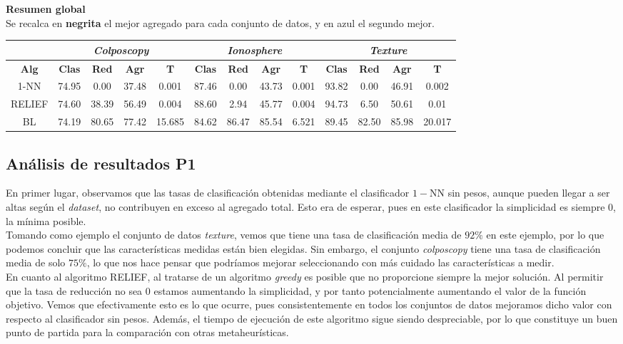 \documentclass[12pt]{article}
\begin{document}
\textbf{Resumen global}\\

Se recalca en \textbf{negrita} el mejor agregado para cada conjunto de datos, y en {\color{blue} azul} el segundo mejor.

\begin{table}[h]
\begin{tabular}{ccccc|cccc|cccc}
\centering
 & \multicolumn{4}{c}{\textit{Colposcopy}} & \multicolumn{4}{c}{\textit{Ionosphere}} & \multicolumn{4}{c}{\textit{Texture}} \\ \hline
\textbf{Alg} & \textbf{Clas} & \textbf{Red} & \textbf{Agr} & \textbf{T} & \textbf{Clas} & \textbf{Red} & \textbf{Agr} & \textbf{T} & \textbf{Clas} & \textbf{Red} & \textbf{Agr} & \textbf{T} \\ \hline
1-NN & 74.95 & 0.00 & 37.48 & 0.001 & 87.46 & 0.00 & 43.73 & 0.001 & 93.82 & 0.00 & 46.91 & 0.002\\
RELIEF & 74.60 & 38.39 & 56.49 & 0.004 & 88.60 & 2.94 & 45.77 & 0.004 & 94.73 & 6.50 & 50.61 & 0.01\\
BL & 74.19 & 80.65 & 77.42 & 15.685 & 84.62 & 86.47 & 85.54 & 6.521 & 89.45 & 82.50 & 85.98 & 20.017\\
\end{tabular}
\end{table}

\subsection*{{\color{red}Análisis de resultados P1}}

En primer lugar, observamos que las tasas de clasificación obtenidas mediante el clasificador $1-$NN sin pesos, aunque pueden llegar a ser altas según el \textit{dataset}, no contribuyen en exceso al agregado total. Esto era de esperar, pues en este clasificador la simplicidad es siempre $0$, la mínima posible.\\

Tomando como ejemplo el conjunto de datos \textit{texture}, vemos que tiene una tasa de clasificación media de $92\%$ en este ejemplo, por lo que podemos concluir que las características medidas están bien elegidas. Sin embargo, el conjunto \textit{colposcopy} tiene una tasa de clasificación media de solo $75\%$, lo que nos hace pensar que podríamos mejorar seleccionando con más cuidado las características a medir.\\

En cuanto al algoritmo RELIEF, al tratarse de un algoritmo \textit{greedy} es posible que no proporcione siempre la mejor solución. Al permitir que la tasa de reducción no sea $0$ estamos aumentando la simplicidad, y por tanto potencialmente aumentando el valor de la función objetivo. Vemos que efectivamente esto es lo que ocurre, pues consistentemente en todos los conjuntos de datos mejoramos dicho valor con respecto al clasificador sin pesos. Además, el tiempo de ejecución de este algoritmo sigue siendo despreciable, por lo que constituye un buen punto de partida para la comparación con otras metaheurísticas.\\
\end{document}
